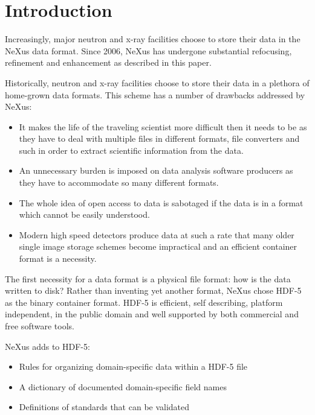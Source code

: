 \documentclass[%
 aip,
rsi,
 amsmath,amssymb,
 reprint,%
]{revtex4-1}
\begin{document}
\maketitle


\section{Introduction}
Increasingly, major neutron and x-ray facilities choose to store their data in the NeXus data format. 
Since 2006, NeXus\cite{nxold} has undergone substantial refocusing, 
refinement and enhancement as described in this paper.  

Historically, neutron and x-ray facilities choose to store their data in a plethora of 
home-grown data formats. This scheme has a number of drawbacks addressed by NeXus: 
\begin{itemize}
\item It makes the life of the traveling scientist more difficult then it needs to be as they have to deal with multiple files 
 in different formats, file converters and such in order to extract scientific information from the data.
 \item An unnecessary burden is imposed on data analysis software producers as they have to accommodate so many different formats.  
\item The whole idea of open access to data is sabotaged if the data is in a format which cannot be easily understood.
\item Modern high speed detectors produce data at such a rate that many older single image storage schemes become impractical and 
 an efficient container format is a necessity. 
\end{itemize}

The first necessity for a data format is a physical file format: how is the data written to disk? Rather than inventing  
yet another format, NeXus chose HDF-5\cite{hdf5} as the binary container format. HDF-5 is efficient, self describing, 
platform independent, in the public domain and well supported by both commercial and free software tools. 

NeXus adds to HDF-5:
\begin{itemize}
\item Rules for organizing domain-specific data within a HDF-5 file
\item A dictionary of documented domain-specific field names
\item Definitions of standards that can be validated
\end{itemize}
\end{document}
